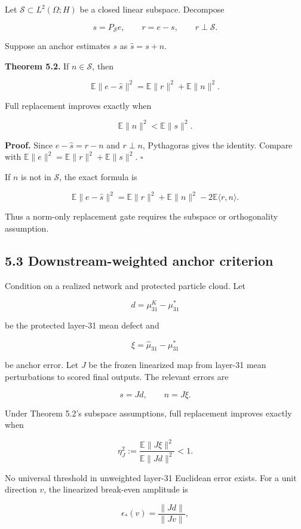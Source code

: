 \documentclass[
  10pt,
]{article}
\begin{document}
Let \(\mathcal S\subset L^2(\Omega;H)\) be a closed linear subspace.
Decompose

\[
s=P_{\mathcal S}e,
\qquad
r=e-s,
\qquad
r\perp\mathcal S.
\]

Suppose an anchor estimates \(s\) as \(\widehat s=s+n\).

\textbf{Theorem 5.2.} If \(n\in\mathcal S\), then

\[
\mathbb E\|e-\widehat s\|^2
=
\mathbb E\|r\|^2+
\mathbb E\|n\|^2.
\]

Full replacement improves exactly when

\[
\mathbb E\|n\|^2<\mathbb E\|s\|^2.
\]

\textbf{Proof.} Since \(e-\widehat s=r-n\) and \(r\perp n\), Pythagoras
gives the identity. Compare with
\(\mathbb E\|e\|^2=\mathbb E\|r\|^2+\mathbb E\|s\|^2\). \(\square\)

If \(n\) is not in \(\mathcal S\), the exact formula is

\[
\mathbb E\|e-\widehat s\|^2
=
\mathbb E\|r\|^2+
\mathbb E\|n\|^2
-2\mathbb E\langle r,n\rangle.
\]

Thus a norm-only replacement gate requires the subspace or orthogonality
assumption.

\subsection{5.3 Downstream-weighted anchor
criterion}\label{downstream-weighted-anchor-criterion}

Condition on a realized network and protected particle cloud. Let

\[
d=\mu_{31}^{K}-\mu_{31}^*
\]

be the protected layer-31 mean defect and

\[
\xi=\widehat\mu_{31}-\mu_{31}^*
\]

be anchor error. Let \(J\) be the frozen linearized map from layer-31
mean perturbations to scored final outputs. The relevant errors are

\[
s=Jd,
\qquad
n=J\xi.
\]

Under Theorem 5.2's subspace assumptions, full replacement improves
exactly when

\[
\eta_J^2
:=
\frac{\mathbb E\|J\xi\|^2}
{\mathbb E\|Jd\|^2}
<1.
\]

No universal threshold in unweighted layer-31 Euclidean error exists.
For a unit direction \(v\), the linearized break-even amplitude is

\[
\epsilon_*(v)
=
\frac{\|Jd\|}{\|Jv\|},
\]
\end{document}

